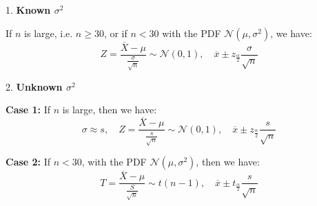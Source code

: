 1. \textbf{Known \(\sigma^2\)}

If \(n\) is large, i.e. \(n \geq 30\), or if \(n < 30\) with the PDF \(\mathcal{N} (\mu, \sigma^2)\), we have:
\[
  Z = \dfrac{\overline{X} - \mu}{\frac{\sigma}{\sqrt{n}}} \sim \mathcal{N}(0, 1), \quad \overline{x} \pm z_{\frac{\alpha}{2}} \dfrac{\sigma}{\sqrt{n}}
\]

2. \textbf{Unknown \(\sigma^2\)}

\textbf{Case 1:} If \(n\) is large, then we have:
\[
  \sigma \approx s, \quad Z = \dfrac{\overline{X} - \mu}{\frac{s}{\sqrt{n}}} \sim \mathcal{N}(0, 1), \quad \overline{x} \pm z_{\frac{\alpha}{2}} \frac{s}{\sqrt{n}}
\]

\textbf{Case 2:} If \(n < 30\), with the PDF \(\mathcal{N} (\mu, \sigma^2)\), then we have:
\[
  T = \frac{\overline{X} - \mu}{\frac{S}{\sqrt{n}}} \sim t(n - 1), \quad \overline{x} \pm t_{\frac{\alpha}{2}} \frac{s}{\sqrt{n}}
\]
